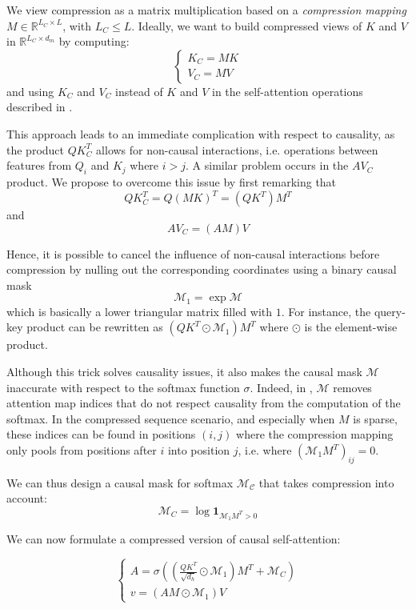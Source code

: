 We view compression as a matrix multiplication based on a \textit{compression mapping} $M \in \mathbb{R}^{L_C \times L}$, with $L_C \leq L$. Ideally, we want to build compressed views of $K$ and $V$ in $\mathbb{R}^{L_C \times d_m}$ by computing:
\begin{equation*}
\begin{cases}
K_C = M K \\
V_C = M V
\end{cases}
\end{equation*}
and using $K_C$ and $V_C$ instead of $K$ and $V$ in the self-attention operations described in .

This approach leads to an immediate complication with respect to causality, as the product $QK_C^T$ allows for non-causal interactions, i.e. operations between features from $Q_i$ and $K_j$ where $i > j$. A similar problem occurs in the $AV_C$ product. We propose to overcome this issue by first remarking that 
$$QK_C^T = Q(MK)^T = (QK^T)M^T$$
and
$$AV_C = (AM)V$$

Hence, it is possible to cancel the influence of non-causal interactions before compression by nulling out the corresponding coordinates using a binary causal mask $$\mathcal{M}_1 = \exp \mathcal{M}$$which is basically a lower triangular matrix filled with $1$. For instance, the query-key product can be rewritten as $(QK^T \odot \mathcal{M}_1) M^T$ where $\odot$ is the element-wise product.

Although this trick solves causality issues, it also makes the causal mask $\mathcal{M}$ inaccurate with respect to the softmax function $\sigma$. Indeed, in , $\mathcal{M}$ removes attention map indices that do not respect causality from the computation of the softmax. In the compressed sequence scenario, and especially when $M$ is sparse, these indices can be found in positions $(i,j)$ where the compression mapping only pools from positions after $i$ into position $j$, i.e. where $\left(\mathcal{M}_1 M^T\right)_{ij} = 0$.

We can thus design a causal mask for softmax $\mathcal{M_C}$ that takes compression into account:
$$
\mathcal{M}_C = \log \mathbf{1}_{\mathcal{M}_1 M^T > 0}
$$

We can now formulate a compressed version of causal self-attention:

\begin{equation}
\begin{cases}
A = \sigma \left(\left(\frac{Q K^T}{\sqrt{d_h}} \odot \mathcal{M}_1\right) M^T + \mathcal{M}_C \right) \\
v = \left(AM \odot \mathcal{M}_1\right)V
\end{cases}
\label{eq:comp_attn_sing_head}
\end{equation}

